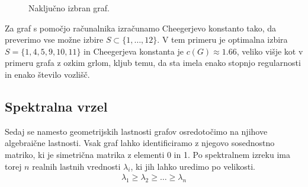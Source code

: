 \begin{primer}
\begin{figure}[H]
        \caption{Naključno izbran graf.}
    \end{figure}
    Za graf s pomočjo računalnika izračunamo Cheegerjevo konstanto tako, da preverimo vse možne izbire \(S \subset \{1, \ldots, 12\}\). V tem primeru je optimalna izbira \(S = \{1, 4, 5, 9, 10, 11\}\) in Cheegerjeva konstanta je \(c(G)\approx 1.66\), veliko višje kot v primeru grafa z ozkim grlom, kljub temu, da sta imela enako stopnjo regularnosti in enako število vozlišč.
\end{primer}
\subsection{Spektralna vrzel}
Sedaj se namesto geometrijskih lastnosti grafov osredotočimo na njihove algebraične lastnosti. Vsak graf lahko identificiramo z njegovo sosednostno matriko, ki je simetrična matrika z elementi 0 in 1. Po spektralnem izreku ima torej \(n\) realnih lastnih vrednosti \(\lambda_i\), ki jih lahko uredimo po velikosti.
\begin{align*}
    \lambda_1 \geq \lambda_2 \geq \ldots \geq \lambda_n
\end{align*}

